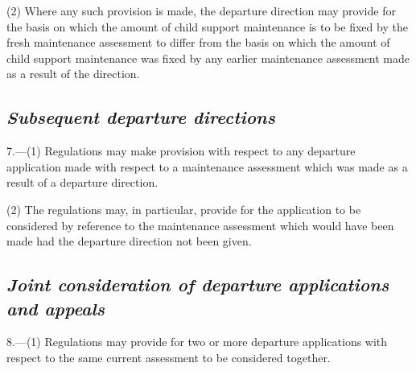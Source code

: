 \documentclass[12pt,a4paper]{article}
\begin{document}
(2) Where any such provision is made, the departure direction may provide for the basis on which the amount of child support maintenance is to be fixed by the fresh maintenance assessment to differ from the basis on which the amount of child support maintenance was fixed by any earlier maintenance assessment made as a result of the direction.


%
%

\subsection*{\itshape Subsequent departure directions}

7.---(1) Regulations may make provision with respect to any departure application made with respect to a maintenance assessment which was made as a result of a departure direction.

(2) The regulations may, in particular, provide for the application to be considered by reference to the maintenance assessment which would have been made had the departure direction not been given.

\subsection*{\itshape Joint consideration of departure applications and appeals}

8.---(1) Regulations may provide for two or more departure applications with respect to the same current assessment to be considered together.

%
\end{document}
